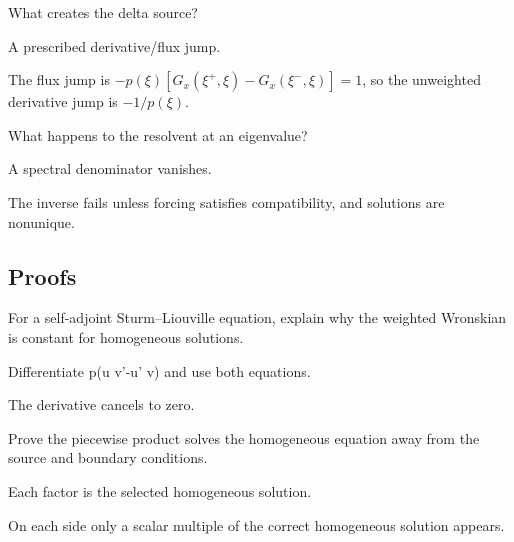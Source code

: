 \begin{exercise}\label{exr:iii26-expand-04}
What creates the delta source?
\end{exercise}
\begin{hint}
A prescribed derivative/flux jump.
\end{hint}
\begin{solution}
The flux jump is $-p(\xi)[G_x(\xi^+,\xi)-G_x(\xi^-,\xi)]=1$, so the unweighted derivative jump is $-1/p(\xi)$.
\end{solution}

\begin{exercise}[Resonance]\label{exr:iii26-expand-05}
What happens to the resolvent at an eigenvalue?
\end{exercise}
\begin{hint}
A spectral denominator vanishes.
\end{hint}
\begin{solution}
The inverse fails unless forcing satisfies compatibility, and solutions are nonunique.
\end{solution}

\subsection*{Proofs}

\begin{exercise}\label{exr:iii26-expand-06}
For a self-adjoint Sturm--Liouville equation, explain why the weighted Wronskian is constant for homogeneous solutions.
\end{exercise}
\begin{hint}
Differentiate p(u v'-u' v) and use both equations.
\end{hint}
\begin{solution}
The derivative cancels to zero.
\end{solution}

\begin{exercise}\label{exr:iii26-expand-07}
Prove the piecewise product solves the homogeneous equation away from the source and boundary conditions.
\end{exercise}
\begin{hint}
Each factor is the selected homogeneous solution.
\end{hint}
\begin{solution}
On each side only a scalar multiple of the correct homogeneous solution appears.
\end{solution}


